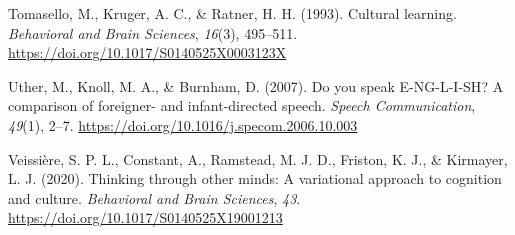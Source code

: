 \documentclass[
  man,floatsintext]{apa6}
\newlength{\cslhangindent}
\newlength{\cslentryspacingunit} %
\newenvironment{CSLReferences}[2] %
 {%
  \setlength{\parindent}{0pt}
  \ifodd #1
  \let\oldpar\par
  \def\par{\hangindent=\cslhangindent\oldpar}
  \fi
  \setlength{\parskip}{#2\cslentryspacingunit}
 }%
 {}
\begin{document}
\begin{CSLReferences}{1}{0}
\leavevmode{}%
Tomasello, M., Kruger, A. C., \& Ratner, H. H. (1993). Cultural learning. \emph{Behavioral and Brain Sciences}, \emph{16}(3), 495--511. \url{https://doi.org/10.1017/S0140525X0003123X}

\leavevmode{}%
Uther, M., Knoll, M. A., \& Burnham, D. (2007). Do you speak {E-NG-L-I-SH}? {A} comparison of foreigner- and infant-directed speech. \emph{Speech Communication}, \emph{49}(1), 2--7. \url{https://doi.org/10.1016/j.specom.2006.10.003}

\leavevmode{}%
Veissière, S. P. L., Constant, A., Ramstead, M. J. D., Friston, K. J., \& Kirmayer, L. J. (2020). Thinking through other minds: {A} variational approach to cognition and culture. \emph{Behavioral and Brain Sciences}, \emph{43}. \url{https://doi.org/10.1017/S0140525X19001213}

\end{CSLReferences}

\endgroup
\end{document}
